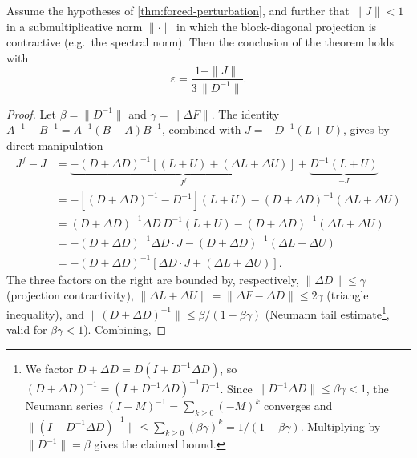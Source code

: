 \begin{lemma}\label{lem:forced-perturbation-explicit}
	Assume the hypotheses of \cref{thm:forced-perturbation}, and further that $\|J\| < 1$ in a submultiplicative norm $\|\cdot\|$ in which the block-diagonal projection is contractive (e.g.\ the spectral norm). Then the conclusion of the theorem holds with
	\begin{equation}
		\varepsilon = \frac{1 - \|J\|}{3\,\|D^{-1}\|}.
		\label{eq:forced-perturbation-epsilon}
	\end{equation}
\end{lemma}
\begin{proof}
	Let $\beta = \|D^{-1}\|$ and $\gamma = \|\Delta F\|$. The identity $A^{-1} - B^{-1} = A^{-1}(B-A) B^{-1}$, combined with $J = -D^{-1}(L+U)$, gives by direct manipulation
	\begin{align*}
		J^f - J
		                                             & = \underbrace{-(D + \Delta D)^{-1}\left[(L+U) + (\Delta L + \Delta U)\right]}_{J^f} + \underbrace{D^{-1}(L+U)}_{-J} \\
		                                             & = -\left[(D + \Delta D)^{-1} - D^{-1}\right](L+U) - (D + \Delta D)^{-1}(\Delta L + \Delta U)                        \\
		                                             & = (D + \Delta D)^{-1}\Delta D \, D^{-1}(L+U) - (D + \Delta D)^{-1}(\Delta L + \Delta U)                             \\
		                                             & = -(D + \Delta D)^{-1}\Delta D \cdot J - (D + \Delta D)^{-1}(\Delta L + \Delta U)                                   \\
		                                             & = -(D + \Delta D)^{-1}\left[\Delta D \cdot J + (\Delta L + \Delta U)\right].
	\end{align*}
	The three factors on the right are bounded by, respectively, $\|\Delta D\| \leq \gamma$ (projection contractivity), $\|\Delta L + \Delta U\| = \|\Delta F - \Delta D\| \leq 2\gamma$ (triangle inequality), and $\|(D + \Delta D)^{-1}\| \leq \beta/(1 - \beta\gamma)$ (Neumann tail estimate\footnote{We factor $D + \Delta D = D(I + D^{-1}\Delta D)$, so $(D + \Delta D)^{-1} = (I + D^{-1}\Delta D)^{-1}D^{-1}$. Since $\|D^{-1}\Delta D\| \leq \beta\gamma < 1$, the Neumann series $(I+M)^{-1} = \sum_{k\geq 0}(-M)^k$ converges and $\|(I + D^{-1}\Delta D)^{-1}\| \leq \sum_{k\geq 0}(\beta\gamma)^k = 1/(1-\beta\gamma)$. Multiplying by $\|D^{-1}\| = \beta$ gives the claimed bound.}, valid for $\beta\gamma < 1$). Combining,

\end{proof}
